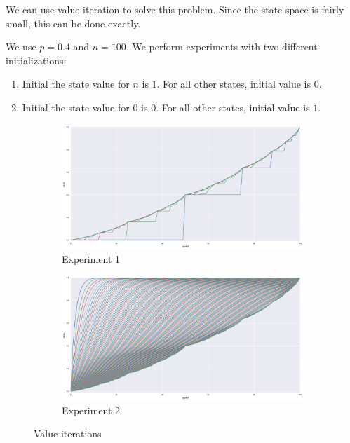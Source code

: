\documentclass{article}
\begin{document}
We can use value iteration to solve this problem. Since the state space is fairly small, this can be done exactly.

We use $p = 0.4$ and $n = 100$. We perform experiments with two different initializations:
\begin{enumerate}
    \item Initial the state value for $n$ is $1$. For all other states, initial value is $0$.
    \item Initial the state value for $0$ is $0$. For all other states, initial value is $1$.
\end{enumerate}

\begin{figure}
    \centering
    \begin{subfigure}[b]{\textwidth}
        \centering
        \includegraphics[width=\textwidth]{figure_1}
        \caption{Experiment 1}
    \end{subfigure}
    
    \begin{subfigure}[b]{\textwidth}
        \centering
        \includegraphics[width=\textwidth]{figure_4}
        \caption{Experiment 2}
    \end{subfigure}
    \caption{Value iterations}
    \label{value_iter}
\end{figure}
\end{document}
